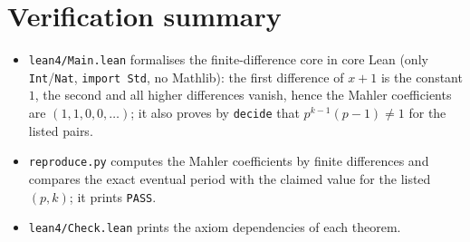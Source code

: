 \documentclass[11pt]{article}
\theoremstyle{definition}
\begin{document}
\section*{Verification summary}
\begin{itemize}
  \item \texttt{lean4/Main.lean} formalises the finite-difference core in core
        Lean (only \texttt{Int}/\texttt{Nat}, \texttt{import Std}, no Mathlib):
        the first difference of $x+1$ is the constant $1$, the second and all
        higher differences vanish, hence the Mahler coefficients are
        $(1,1,0,0,\dots)$; it also proves by \texttt{decide} that
        $p^{k-1}(p-1)\ne 1$ for the listed pairs.
  \item \texttt{reproduce.py} computes the Mahler coefficients by finite
        differences and compares the exact eventual period with the claimed
        value for the listed $(p,k)$; it prints \texttt{PASS}.
  \item \texttt{lean4/Check.lean} prints the axiom dependencies of each
        theorem.
\end{itemize}
\end{document}
